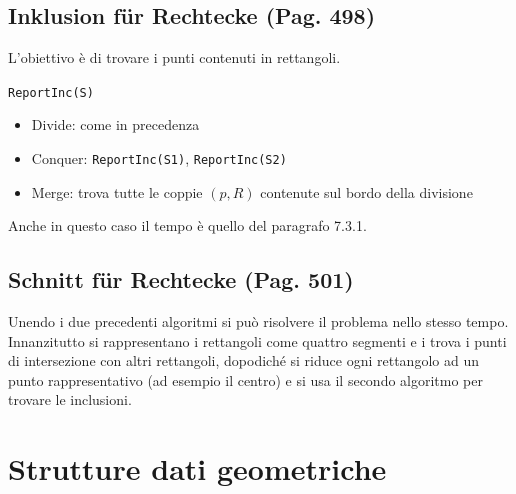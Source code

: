 \documentclass[a4paper]{book}
\newcommand{\inline}[1]{\lstinline!#1!}%
\begin{document}
\subsection{Inklusion für Rechtecke (Pag. 498)}
L'obiettivo è di trovare i punti contenuti in rettangoli.

\inline{ReportInc(S)}
\begin{itemize}
\item Divide: come in precedenza
\item Conquer: \inline{ReportInc(S1)}, \inline{ReportInc(S2)}
\item Merge: trova tutte le coppie $(p,R)$ contenute sul bordo della divisione
\end{itemize}
Anche in questo caso il tempo è quello del paragrafo 7.3.1.
\subsection{Schnitt für Rechtecke (Pag. 501)}
Unendo i due precedenti algoritmi si può risolvere il problema nello stesso tempo. Innanzitutto si rappresentano i rettangoli come quattro segmenti e i trova i punti di intersezione con altri rettangoli, dopodiché si riduce ogni rettangolo ad un punto rappresentativo (ad esempio il centro) e si usa il secondo algoritmo per trovare le inclusioni.

\section{Strutture dati geometriche}
\end{document}
